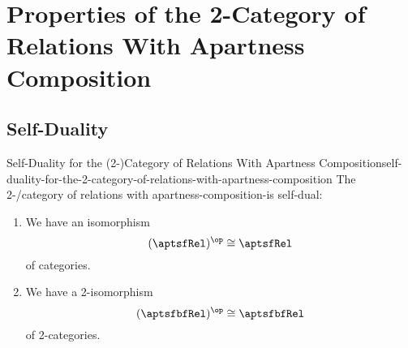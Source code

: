 \section{Properties of the 2-Category of Relations With Apartness Composition}\label{section-properties-of-the-2-category-of-relations-with-apartness-composition}
\subsection{Self-Duality}\label{subsection-self-duality-of-rel-apartness}
\begin{proposition}{Self-Duality for the (2-)Category of Relations With Apartness Composition}{self-duality-for-the-2-category-of-relations-with-apartness-composition}%
    The 2-/category of relations with apartness-composition-is self-dual:
    \begin{enumerate}
        \item\label{self-duality-for-the-2-category-of-relations-with-apartness-composition-1}We have an isomorphism
            \[
                (\aptsfRel)^{\op}%
                \cong%
                \aptsfRel%
            \]%
            of categories.
        \item\label{self-duality-for-the-2-category-of-relations-with-apartness-composition-2}We have a 2-isomorphism
            \[
                (\aptsfbfRel)^{\op}%
                \cong%
                \aptsfbfRel%
            \]%
            of 2-categories.
    \end{enumerate}
\end{proposition}
